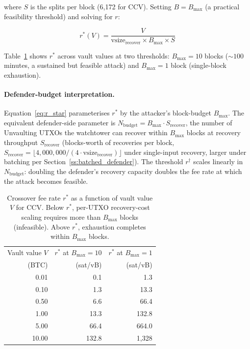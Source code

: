 \noindent
where $S$ is the splits per block (6{,}172 for CCV). Setting $B = B_{\max}$
(a practical feasibility threshold) and solving for $r$:

\begin{equation} \label{eq:r_star}
r^*(V) = \frac{V}{\text{vsize}_{\text{recover}} \times B_{\max} \times S}
\end{equation}

\noindent
Table~\ref{tab:r_star_sensitivity} shows $r^*$ across vault values at two
thresholds: $B_{\max} = 10$ blocks (${\sim}100$ minutes, a sustained but feasible
attack) and $B_{\max} = 1$ block (single-block exhaustion).

\paragraph{Defender-budget interpretation.}
Equation~\ref{eq:r_star} parameterises $r^*$ by the attacker's
block-budget $B_{\max}$. The equivalent defender-side parameter is
$N_{\mathrm{budget}} = B_{\max} \cdot S_{\mathrm{recover}}$, the
number of Unvaulting UTXOs the watchtower can recover within
$B_{\max}$ blocks at recovery throughput $S_{\mathrm{recover}}$
(blocks-worth of recoveries per block, $S_{\mathrm{recover}} =
\lfloor 4{,}000{,}000 / (4 \cdot \text{vsize}_{\text{recover}}) \rfloor$
under single-input recovery, larger under batching per
Section~\ref{ss:batched_defender}). The threshold $r^\dagger$
scales linearly in $N_{\mathrm{budget}}$: doubling the defender's
recovery capacity doubles the fee rate at which the attack becomes
feasible.

\begin{table}[t]
\centering
\caption{Crossover fee rate $r^*$ as a function of vault value $V$ for CCV.
Below $r^*$, per-UTXO recovery-cost scaling requires more than $B_{\max}$ blocks
(infeasible). Above $r^*$, exhaustion completes within $B_{\max}$ blocks.}
\label{tab:r_star_sensitivity}
\begin{tabular}{@{}rrr@{}}
\toprule
Vault value $V$ & $r^*$ at $B_{\max} = 10$ & $r^*$ at $B_{\max} = 1$ \\
(BTC)           & (sat/vB)                  & (sat/vB) \\
\midrule
0.01 &   0.1 &    1.3 \\
0.10 &   1.3 &   13.3 \\
0.50 &   6.6 &   66.4 \\
1.00 &  13.3 &  132.8 \\
5.00 &  66.4 &  664.0 \\
10.00 & 132.8 & 1{,}328 \\
\bottomrule
\end{tabular}
\end{table}

